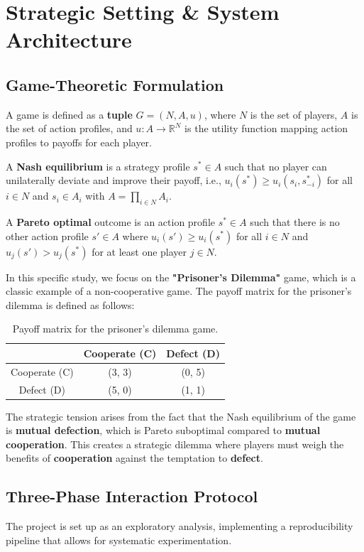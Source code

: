 \section{Strategic Setting \& System Architecture}

\subsection{Game-Theoretic Formulation}
A game is defined as a \textbf{tuple} \( G = (N, A, u) \), where $N$ is the set of players, $A$ is the set of action profiles, and \( u: A \rightarrow \mathbb{R}^N \) is the utility function mapping action profiles to payoffs for each player.

A \textbf{Nash equilibrium} is a strategy profile \( s^* \in A \) such that no player can unilaterally deviate and improve their payoff, i.e., \( u_i(s^*) \geq u_i(s_i, s_{-i}^*) \) for all \( i \in N \) and \( s_i \in A_i \) with \(A = \prod_{i \in N} A_i \).

A \textbf{Pareto optimal} outcome is an action profile \( s^* \in A \) such that there is no other action profile \( s' \in A \) where \( u_i(s') \geq u_i(s^*) \) for all \( i \in N \) and \( u_j(s') > u_j(s^*) \) for at least one player \( j \in N \).

In this specific study, we focus on the \textbf{"Prisoner's Dilemma"} game, which is a classic example of a non-cooperative game. The payoff matrix for the prisoner's dilemma is defined as follows:
\begin{table}[htbp]
    \centering
    \begin{tabular}{c|c|c}
                      & Cooperate (C) & Defect (D) \\
        \hline
        Cooperate (C) & (3, 3)        & (0, 5)     \\
        Defect (D)    & (5, 0)        & (1, 1)     \\
    \end{tabular}
    \caption{Payoff matrix for the prisoner's dilemma game.}
    \label{tab:payoff_matrix}
\end{table}

The strategic tension arises from the fact that the Nash equilibrium of the game is \textbf{mutual defection}, which is Pareto suboptimal compared to \textbf{mutual cooperation}.
This creates a strategic dilemma where players must weigh the benefits of \textbf{cooperation} against the temptation to \textbf{defect}.

\subsection{Three-Phase Interaction Protocol}
The project is set up as an exploratory analysis, implementing a reproducibility pipeline that allows for systematic experimentation.

